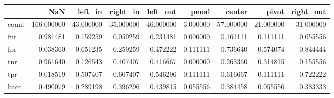 \begin{tabular}{lrrrrrrrr}
\toprule
{} &         NaN &    left\_in &   right\_in &   left\_out &     penal &     center &      pivot &  right\_out \\
\midrule
count &  166.000000 &  43.000000 &  35.000000 &  46.000000 &  3.000000 &  57.000000 &  21.000000 &  31.000000 \\
fnr   &    0.981481 &   0.159259 &   0.059259 &   0.231481 &  0.000000 &   0.161111 &   0.111111 &   0.055556 \\
fpr   &    0.038360 &   0.651235 &   0.259259 &   0.472222 &  0.111111 &   0.736640 &   0.574074 &   0.844444 \\
tnr   &    0.961640 &   0.126543 &   0.407407 &   0.416667 &  0.000000 &   0.263360 &   0.314815 &   0.155556 \\
tpr   &    0.018519 &   0.507407 &   0.607407 &   0.546296 &  0.111111 &   0.616667 &   0.111111 &   0.722222 \\
bacc  &    0.490079 &   0.289198 &   0.396296 &   0.439815 &  0.055556 &   0.384458 &   0.055556 &   0.383333 \\
\bottomrule
\end{tabular}
